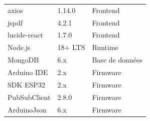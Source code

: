 \begin{center}
\begin{longtable}{lll}
axios                & 1.14.0  & Frontend \\
jspdf                & 4.2.1   & Frontend \\
lucide-react         & 1.7.0   & Frontend \\
Node.js              & 18+ LTS & Runtime \\
MongoDB              & 6.x     & Base de données \\
Arduino IDE          & 2.x     & Firmware \\
SDK ESP32            & 2.x     & Firmware \\
PubSubClient         & 2.8.0   & Firmware \\
ArduinoJson          & 6.x     & Firmware \\
\end{longtable}
\end{center}
